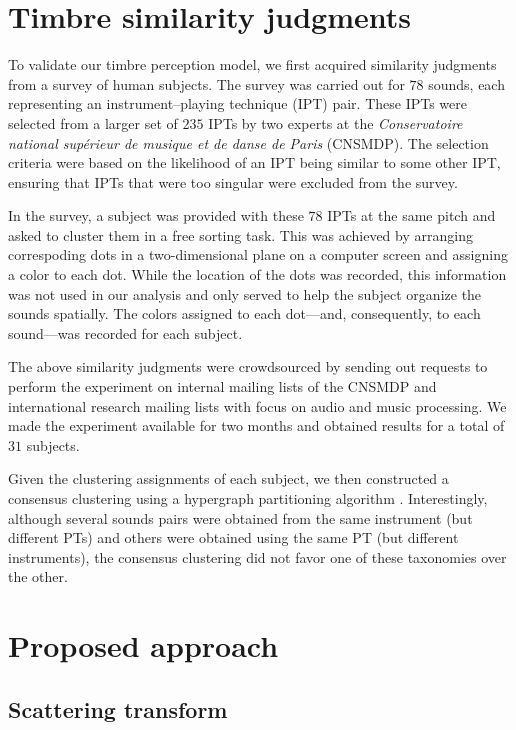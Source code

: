 \documentclass{bmcart}
\begin{document}
\section*{Timbre similarity judgments}
\label{sec:survey}

To validate our timbre perception model, we first acquired similarity judgments from a survey of human subjects.
The survey was carried out for $78$ sounds, each representing an instrument--playing technique (IPT) pair.
These IPTs were selected from a larger set of $235$ IPTs by two experts at the \emph{Conservatoire national sup\'erieur de musique et de danse de Paris} (CNSMDP).
The selection criteria were based on the likelihood of an IPT being similar to some other IPT, ensuring that IPTs that were too singular were excluded from the survey.

In the survey, a subject was provided with these $78$ IPTs at the same pitch and asked to cluster them in a free sorting task.
This was achieved by arranging correspoding dots in a two-dimensional plane on a computer screen and assigning a color to each dot.
While the location of the dots was recorded, this information was not used in our analysis and only served to help the subject organize the sounds spatially.
The colors assigned to each dot---and, consequently, to each sound---was recorded for each subject.

The above similarity judgments were crowdsourced by sending out requests to perform the experiment on internal mailing lists of the CNSMDP and international research mailing lists with focus on audio and music processing.
We made the experiment available for two months and obtained results for a total of $31$ subjects.

Given the clustering assignments of each subject, we then constructed a consensus clustering using a hypergraph partitioning algorithm \cite{kernighan1970efficient,han1997scalable,strehl2002cluster}.
Interestingly, although several sounds pairs were obtained from the same instrument (but different PTs) and others were obtained using the same PT (but different instruments), the consensus clustering did not favor one of these taxonomies over the other.

\section*{Proposed approach}
\label{sec:method}

\subsection*{Scattering transform}
\label{sec:scattering}
\end{document}
